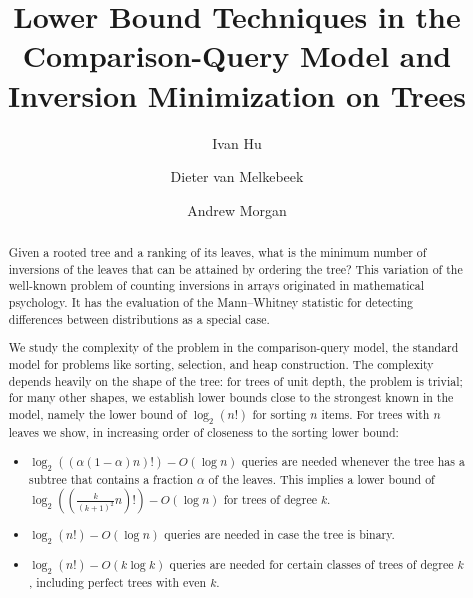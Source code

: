 \documentclass{toc}
\begin{document}
\begin{frontmatter}%

%
%
%

%
%

%
%
\title{Lower Bound Techniques in the Comparison-Query Model and \\ Inversion Minimization on Trees}

%
%
%
%
%
%

%
%
%
%
%
%
%
%
%
%
%
%


%
%
%
%

%

\author[hu]{Ivan Hu}
\author[vanmelkebeek]{Dieter van Melkebeek}
\author[morgan]{Andrew Morgan}

%
%
%
%

%
%
%
%
%
%
%
%
\begin{abstract}
Given a rooted tree and a ranking of its leaves, what is the minimum number of inversions of the leaves that can be attained by ordering the tree? This variation of the well-known problem of counting inversions in arrays originated in mathematical psychology. It has the evaluation of the Mann--Whitney statistic for detecting differences between distributions as a special case. 

We study the complexity of the problem in the comparison-query model, the standard model for problems like sorting, selection, and heap construction. The complexity depends heavily on the shape of the tree: for trees of unit depth, the problem is trivial; for many other shapes, we establish lower bounds close to the strongest known in the model, namely the lower bound of $\log_2(n!)$ for sorting $n$ items. For trees with $n$ leaves we show, in increasing order of closeness to the sorting lower bound:
\begin{itemize}
\item[(a)] $\log_2((\alpha(1-\alpha)n)!) - O(\log n)$ queries are needed whenever the tree has a subtree that contains a fraction $\alpha$ of the leaves. This implies a lower bound of $\log_2((\frac{k}{(k+1)^2}n)!) - O(\log n)$ for trees of degree $k$.
\item[(b)] $\log_2(n!) - O(\log n)$ queries are needed in case the tree is binary. 
\item[(c)] $\log_2(n!) - O(k \log k)$ queries are needed for certain classes of trees of degree $k$, including perfect trees with even $k$.
\end{itemize}


\end{abstract}
\end{frontmatter}
\end{document}
